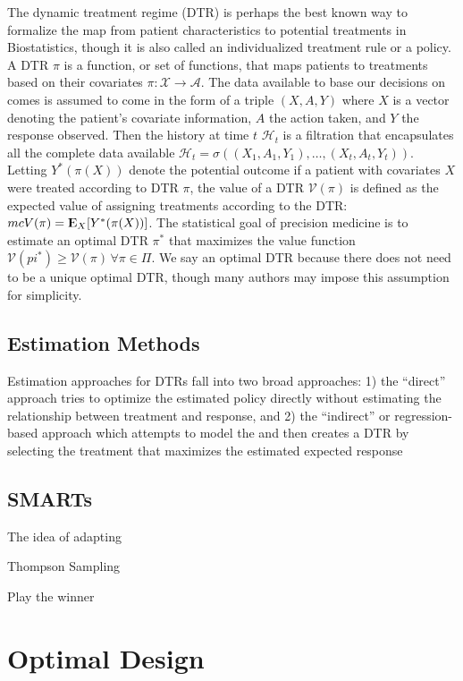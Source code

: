 \documentclass[12pt,,letterpaper,twoside]{report}
\DeclareMathOperator{\E}{{\rm I\kern-.3em E}}
\newcommand{\mcA}{{\mathcal{A}}}
\newcommand{\mcH}{{\mathcal{H}}}
\newcommand{\mcV}{{\mathcal{V}}}
\newcommand{\mcX}{{\mathcal{X}}}
\begin{document}
The dynamic treatment regime (DTR) is perhaps the best known way to
formalize the map from patient characteristics to potential treatments
in Biostatistics, though it is also called an individualized treatment
rule or a policy. A DTR \(\pi\) is a function, or set of functions, that
maps patients to treatments based on their covariates
\(\pi: \mcX \to \mcA\). The data available to base our decisions on
comes is assumed to come in the form of a triple \((X, A, Y)\) where
\(X\) is a vector denoting the patient's covariate information, \(A\)
the action taken, and \(Y\) the response observed. Then the history at
time \(t\) \(\mcH_t\) is a filtration that encapsulates all the complete
data available
\(\mcH_t = \sigma\left((X_1, A_1, Y_1), \ldots, (X_t, A_t, Y_t)\right)\).
Letting \(Y^*\left(\pi(X)\right)\) denote the potential outcome if a
patient with covariates \(X\) were treated according to DTR \(\pi\), the
value of a DTR \(\mcV(\pi)\) is defined as the expected value of
assigning treatments according to the DTR:
\(mcV(\pi) = \E_X[Y^*(\pi(X))]\). The statistical goal of precision
medicine is to estimate an optimal DTR \(\pi^*\) that maximizes the
value function \(\mcV(pi^*) \geq \mcV(\pi) \,\forall \pi \in \Pi\). We
say an optimal DTR because there does not need to be a unique optimal
DTR, though many authors may impose this assumption for simplicity.

\hypertarget{estimation-methods}{%
\subsection{Estimation Methods}\label{estimation-methods}}

Estimation approaches for DTRs fall into two broad approaches: 1) the
``direct'' approach tries to optimize the estimated policy directly
without estimating the relationship between treatment and response, and
2) the ``indirect'' or regression-based approach which attempts to model
the and then creates a DTR by selecting the treatment that maximizes the
estimated expected response

\hypertarget{smarts}{%
\subsection{SMARTs}\label{smarts}}

The idea of adapting

Thompson Sampling

Play the winner

\hypertarget{optimal-design}{%
\section{Optimal Design}\label{optimal-design}}
\end{document}
